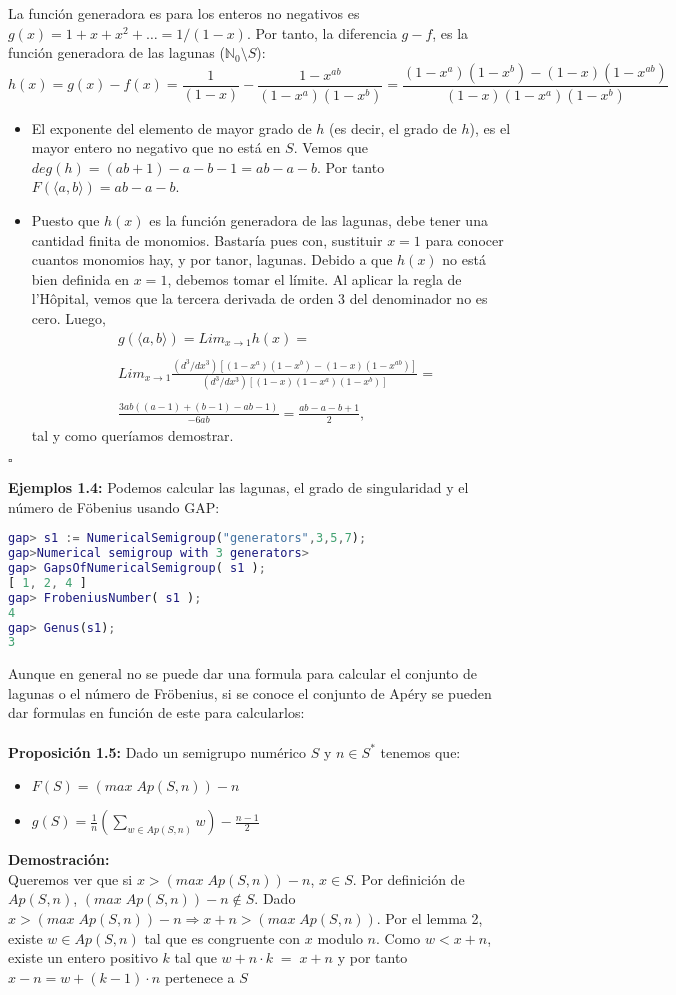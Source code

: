 \documentclass[11pt,spanish]{book}
\newcommand{\qed}{\begin{flushright} $\square$ \end{flushright}}
\begin{document}
La función generadora es para los enteros no negativos es $g(x)=1+x+x^2+\ldots=1/(1-x)$. Por tanto, la diferencia $g-f$, es la función generadora de las lagunas ($\mathbb{N}_0\setminus S$):
$$h(x)=g(x)-f(x)=\frac{1}{(1-x)}-\frac{1-x^{ab}}{(1-x^{a})(1-x^{b})} = \frac{(1-x^{a})(1-x^{b})-(1-x)(1-x^{ab})}{(1-x)(1-x^{a})(1-x^{b})}$$
\begin{itemize}
\item El exponente del elemento de mayor grado de $h$ (es decir, el grado de $h$), es el mayor entero no negativo que no está en $S$. Vemos que $deg(h)=(ab+1)-a-b-1=ab-a-b$. Por tanto $F(\langle a,b\rangle) = ab-a-b$.
\item Puesto que $h(x)$ es la función generadora de las lagunas, debe tener una cantidad finita de monomios. Bastaría pues con, sustituir $x=1$ para conocer cuantos monomios hay, y por tanor, lagunas. Debido a que $h(x)$ no está bien definida en $x=1$, debemos tomar el límite. Al aplicar la regla de l'Hôpital, vemos que la tercera derivada de orden $3$ del denominador no es cero. Luego,
\begin{align*}
&g(\langle a,b\rangle)=Lim_{x\rightarrow 1}h(x) =\\
\\&Lim_{x\rightarrow 1}\frac{(d^{3}/dx^{3})[(1-x^{a})(1-x^{b})-(1-x)(1-x^{ab})]}{(d^{3}/dx^{3})[(1-x)(1-x^{a})(1-x^{b})]}=\\
\\&\frac{3ab((a-1)+(b-1)-ab-1)}{-6ab}
=\frac{ab-a-b+1}{2},
\end{align*}
tal y como queríamos demostrar.
\end{itemize}
\qed
\textbf{Ejemplos 1.4:} Podemos calcular las lagunas, el grado de singularidad y el número de Föbenius usando GAP:
\begin{lstlisting}[language=gap]
gap> s1 := NumericalSemigroup("generators",3,5,7);
gap>Numerical semigroup with 3 generators>
gap> GapsOfNumericalSemigroup( s1 );
[ 1, 2, 4 ]
gap> FrobeniusNumber( s1 );
4
gap> Genus(s1);
3
\end{lstlisting}

Aunque en general no se puede dar una formula para calcular el conjunto de lagunas o el número de Fröbenius, si se conoce el conjunto de Apéry se pueden dar formulas en función de este para calcularlos:\\ \\
\textbf{Proposición 1.5:} Dado un semigrupo numérico $S$ y $n\in S^{*}$ tenemos que:
\begin{itemize}
\item $F(S)=(max\;Ap(S,n))-n$
\item $g(S)=\frac{1}{n}(\sum_{w\in Ap(S,n)} w)-\frac{n-1}{2}$
\end{itemize}
\textbf{Demostración:}\\
Queremos ver que si $x>(max\;Ap(S,n))-n$, $x\in S$. Por definición de $Ap(S,n)$, $(max\;Ap(S,n))-n \notin S$. Dado $x>(max\;Ap(S,n))-n\Rightarrow x+n>(max\;Ap(S,n))$. Por el lemma 2, existe $w\in Ap(S,n)$ tal que es congruente con $x$ modulo $n$. Como $w<x+n$, existe un entero positivo $k$ tal que $w+n\cdot k\;=\; x+n $ y por tanto $x-n=w+(k-1)\cdot n$ pertenece a $S$\\
\end{document}
